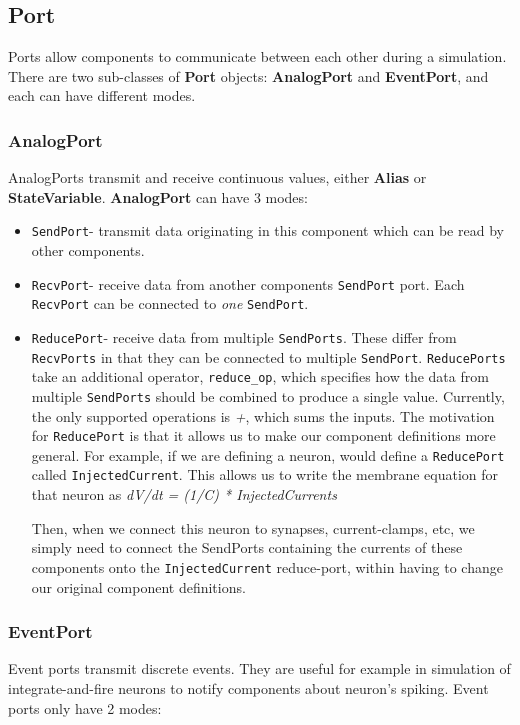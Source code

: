 \documentclass{article}
\newcommand{\nmlClass}[1]{{\bf #1}}
\newcommand{\StateVariable}{{\bf{StateVariable}}\xspace}
\newcommand{\Alias}{{\bf{Alias}}\xspace}
\newcommand{\AnalogPort}{{\bf{AnalogPort}}\xspace}
\newcommand{\SendPort}{{\tt{SendPort}}\xspace}
\newcommand{\RecvPort}{{\tt{RecvPort}}\xspace}
\newcommand{\ReducePort}{{\tt{ReducePort}}\xspace}
\newcommand{\SendPorts}{{\tt{SendPorts}}\xspace}
\newcommand{\RecvPorts}{{\tt{RecvPorts}}\xspace}
\newcommand{\ReducePorts}{{\tt{ReducePorts}}\xspace}
\begin{document}
\subsection{Port}
\label{ports}

Ports allow components to communicate between each other during a simulation.
There are two sub-classes of \nmlClass{Port} objects: \nmlClass{AnalogPort}
and \nmlClass{EventPort}, and each can have different modes.

\subsubsection{AnalogPort}

AnalogPorts transmit and receive continuous values, either \Alias
or \StateVariable. \AnalogPort can have 3 modes:
\begin{itemize}
\item \SendPort - transmit data originating in this component which can
be read by other components.
\item \RecvPort - receive data from another components \SendPort
port. Each \RecvPort can be connected to \emph{one} \SendPort.
\item \ReducePort - receive data from multiple \SendPorts. These
differ from \RecvPorts in that they can be connected to multiple
\SendPort. \ReducePorts take an additional operator,
{\tt reduce\_op}, which specifies how the data from multiple \SendPorts
should be combined to produce a single value. Currently, the
only supported operations is \textsl{+}, which sums the inputs.
The motivation for \ReducePort is that it allows us to make our
component definitions more general. For example, if we are defining a
neuron, would define a \ReducePort called {\tt InjectedCurrent}.
This allows us to write the membrane equation for that neuron as
\textsl{dV/dt = (1/C) * InjectedCurrents}

Then, when we connect this neuron to synapses, current-clamps, etc, we
simply need to connect the SendPorts containing the currents of these
components onto the {\tt InjectedCurrent} reduce-port, within having
to change our original component definitions.
\end{itemize}

\subsubsection{EventPort}
\label{eventPorts}

Event ports transmit discrete events. They are useful for example in
simulation of integrate-and-fire neurons to notify components about neuron's
spiking. Event ports only have 2 modes:
\end{document}
